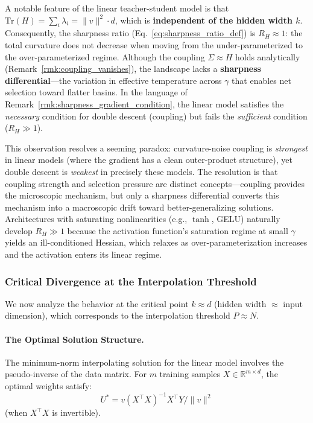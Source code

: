 \documentclass[
  journal=largetwo,
  simfonts=false,
  year=2025,
  volume=37,
]{cup-journal}
\begin{document}
\begin{remark}\label{rmk:linear_weak_dd}
A notable feature of the linear teacher-student model is that $\mathrm{Tr}(H) = \sum_i \lambda_i = \|v\|^2 \cdot d$, which is \textbf{independent of the hidden width $k$}. Consequently, the sharpness ratio (Eq.~\ref{eq:sharpness_ratio_def}) is $R_H \approx 1$: the total curvature does not decrease when moving from the under-parameterized to the over-parameterized regime. Although the coupling $\Sigma \approx H$ holds analytically (Remark~\ref{rmk:coupling_vanishes}), the landscape lacks a \textbf{sharpness differential}---the variation in effective temperature across $\gamma$ that enables net selection toward flatter basins. In the language of Remark~\ref{rmk:sharpness_gradient_condition}, the linear model satisfies the \textit{necessary} condition for double descent (coupling) but fails the \textit{sufficient} condition ($R_H \gg 1$).

This observation resolves a seeming paradox: curvature-noise coupling is \textit{strongest} in linear models (where the gradient has a clean outer-product structure), yet double descent is \textit{weakest} in precisely these models. The resolution is that coupling strength and selection pressure are distinct concepts---coupling provides the microscopic mechanism, but only a sharpness differential converts this mechanism into a macroscopic drift toward better-generalizing solutions. Architectures with saturating nonlinearities (e.g., $\tanh$, GELU) naturally develop $R_H \gg 1$ because the activation function's saturation regime at small $\gamma$ yields an ill-conditioned Hessian, which relaxes as over-parameterization increases and the activation enters its linear regime.
\end{remark}



\subsubsection{Critical Divergence at the Interpolation Threshold}

We now analyze the behavior at the critical point $k \approx d$ (hidden width $\approx$ input dimension), which corresponds to the interpolation threshold $P \approx N$.

\paragraph{The Optimal Solution Structure.}
The minimum-norm interpolating solution for the linear model involves the pseudo-inverse of the data matrix. For $m$ training samples $X \in \mathbb{R}^{m \times d}$, the optimal weights satisfy:
\begin{equation}
    U^* = v (X^\top X)^{-1} X^\top Y / \|v\|^2
\end{equation}
(when $X^\top X$ is invertible).
\end{document}

